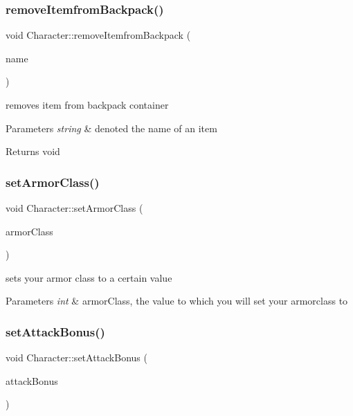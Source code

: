 \subsubsection{\texorpdfstring{remove\+Itemfrom\+Backpack()}{removeItemfromBackpack()}}
{\footnotesize\ttfamily void Character\+::remove\+Itemfrom\+Backpack (\begin{DoxyParamCaption}\item[{string}]{name }\end{DoxyParamCaption})}

removes item from backpack container 
\begin{DoxyParams}{Parameters}
{\em string} & denoted the name of an item \\
\hline
\end{DoxyParams}
\begin{DoxyReturn}{Returns}
void 
\end{DoxyReturn}
\hypertarget{class_character_a5b03ceb09b3e175dc9d6c3247a6b9b66}{}\label{class_character_a5b03ceb09b3e175dc9d6c3247a6b9b66} 
\subsubsection{\texorpdfstring{set\+Armor\+Class()}{setArmorClass()}}
{\footnotesize\ttfamily void Character\+::set\+Armor\+Class (\begin{DoxyParamCaption}\item[{int}]{armor\+Class }\end{DoxyParamCaption})}

sets your armor class to a certain value 
\begin{DoxyParams}{Parameters}
{\em int} & armor\+Class, the value to which you will set your armorclass to \\
\hline
\end{DoxyParams}
\hypertarget{class_character_a4b87bdb15a0e37b4bfecb661822738ad}{}\label{class_character_a4b87bdb15a0e37b4bfecb661822738ad} 
\subsubsection{\texorpdfstring{set\+Attack\+Bonus()}{setAttackBonus()}}
{\footnotesize\ttfamily void Character\+::set\+Attack\+Bonus (\begin{DoxyParamCaption}\item[{const vector$<$ int $>$ \&}]{attack\+Bonus }\end{DoxyParamCaption})}

